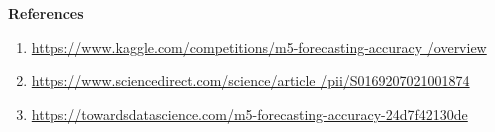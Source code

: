 \documentclass[fleqn,10pt]{SelfArx} %
\begin{document}



\item \textbf{References}
\begin{enumerate}
    \item \href{https://www.kaggle.com/competitions/m5-forecasting-accuracy/overview}{https://www.kaggle.com/competitions/m5-forecasting-accuracy
    /overview}
\item\href{https://www.sciencedirect.com/science/article/pii/S0169207021001874}{https://www.sciencedirect.com/science/article
/pii/S0169207021001874}
\item \href{https://towardsdatascience.com/m5-forecasting-accuracy-24d7f42130de}{https://towardsdatascience.com/m5-forecasting-accuracy-24d7f42130de}

\end{enumerate}




\end{document}
